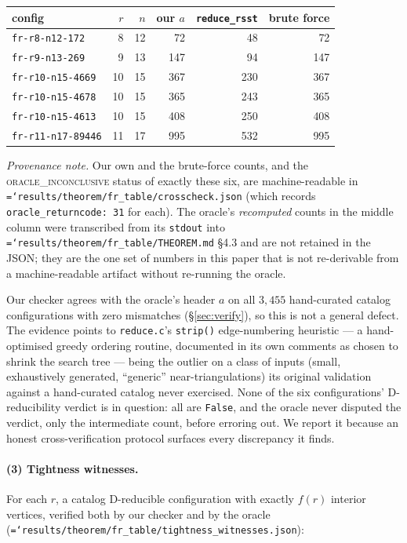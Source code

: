 \documentclass[11pt]{article}
\theoremstyle{definition}
\newcommand{\art}[1]{{\texttt{\hyphenchar\font=`\-\relax #1}}}
\begin{document}
\begin{center}\small
\begin{tabular}{lrrrrr}
\toprule
config & $r$ & $n$ & our $a$ & \texttt{reduce\_rsst} & brute force \\
\midrule
\texttt{fr-r8-n12-172}    & 8  & 12 & 72  & 48  & 72 \\
\texttt{fr-r9-n13-269}    & 9  & 13 & 147 & 94  & 147 \\
\texttt{fr-r10-n15-4669}  & 10 & 15 & 367 & 230 & 367 \\
\texttt{fr-r10-n15-4678}  & 10 & 15 & 365 & 243 & 365 \\
\texttt{fr-r10-n15-4613}  & 10 & 15 & 408 & 250 & 408 \\
\texttt{fr-r11-n17-89446} & 11 & 17 & 995 & 532 & 995 \\
\bottomrule
\end{tabular}
\end{center}

\emph{Provenance note.} Our own and the brute-force counts, and the
\textsc{oracle\_inconclusive} status of exactly these six, are machine-readable in
\art{results/theorem/fr\_table/crosscheck.json} (which records
\texttt{oracle\_returncode: 31} for each). The oracle's \emph{recomputed} counts in
the middle column were transcribed from its \texttt{stdout} into
\art{results/theorem/fr\_table/THEOREM.md} \S4.3 and are not retained in the JSON;
they are the one set of numbers in this paper that is not re-derivable from a
machine-readable artifact without re-running the oracle.

Our checker agrees with the oracle's header $a$ on all $3{,}455$ hand-curated
catalog configurations with zero mismatches (\S\ref{sec:verify}), so this is not a
general defect. The evidence points to \texttt{reduce.c}'s \texttt{strip()}
edge-numbering heuristic --- a hand-optimised greedy ordering routine, documented in
its own comments as chosen to shrink the search tree --- being the outlier on a class
of inputs (small, exhaustively generated, ``generic'' near-triangulations) its
original validation against a hand-curated catalog never exercised. None of the six
configurations' D-reducibility verdict is in question: all are \texttt{False}, and
the oracle never disputed the verdict, only the intermediate count, before erroring
out. We report it because an honest cross-verification protocol surfaces every
discrepancy it finds.

\paragraph{(3) Tightness witnesses.} For each $r$, a catalog D-reducible
configuration with exactly $f(r)$ interior vertices, verified both by our checker and
by the oracle (\art{results/theorem/fr\_table/tightness\_witnesses.json}):
\end{document}

